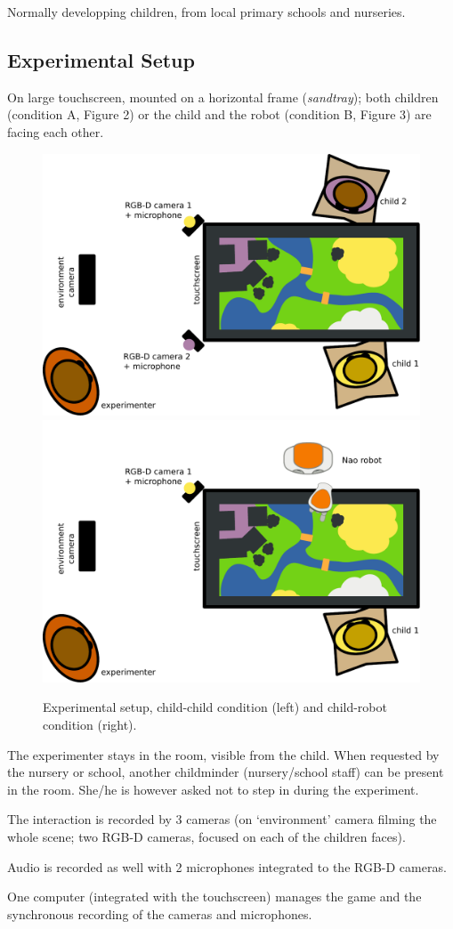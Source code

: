 \documentclass{article}
\begin{document}
Normally developping children, from local primary schools and nurseries.



\subsection{Experimental Setup}\label{experimental-setup}

On large touchscreen, mounted on a horizontal frame (\emph{sandtray});
both children (condition A, Figure 2) or the child and the robot
(condition B, Figure 3) are facing each other.

\begin{figure}[htbp]
    \centering
    \includegraphics[width=0.4\linewidth]{setup_child_child_top}
    \hspace{1.5cm}
    \includegraphics[width=0.4\linewidth]{setup_child_robot_top}
    \caption{Experimental setup, child-child condition (left) and child-robot
    condition (right).}
\end{figure}

The experimenter stays in the room, visible from the child. When
requested by the nursery or school, another childminder (nursery/school
staff) can be present in the room. She/he is however asked not to step
in during the experiment.

The interaction is recorded by 3 cameras (on `environment' camera
filming the whole scene; two RGB-D cameras, focused on each of the
children faces).

Audio is recorded as well with 2 microphones integrated to the RGB-D
cameras.

One computer (integrated with the touchscreen) manages the game and the
synchronous recording of the cameras and microphones.
\end{document}
